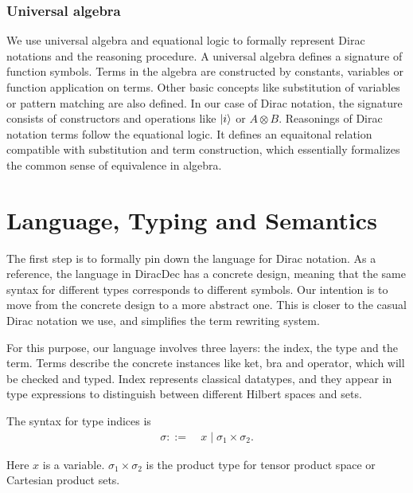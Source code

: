 \documentclass[runningheads]{llncs}
\begin{document}
\subsubsection{Universal algebra}
We use universal algebra and equational logic to formally represent Dirac notations and the reasoning procedure.
A universal algebra defines a signature of function symbols.
Terms in the algebra are constructed by constants, variables or function application on terms. 
Other basic concepts like substitution of variables or pattern matching are also defined.
In our case of Dirac notation, the signature consists of constructors and operations like $\ket{i}$ or $A \otimes B$.
Reasonings of Dirac notation terms follow the equational logic. It defines an equaitonal relation compatible with substitution and term construction, which essentially formalizes the common sense of equivalence in algebra.



\section{Language, Typing and Semantics}
The first step is to formally pin down the language for Dirac notation.
As a reference, the language in DiracDec has a concrete design, meaning that the same syntax for different types corresponds to different symbols.
Our intention is to move from the concrete design to a more abstract one. This is closer to the casual Dirac notation we use, and simplifies the term rewriting system.

For this purpose, our language involves three layers: the index, the type and the term.
Terms describe the concrete instances like ket, bra and operator, which will be checked and typed.
Index represents classical datatypes, and they appear in type expressions to distinguish between different Hilbert spaces and sets.
\begin{definition}
    The syntax for type indices is
    \begin{align*}
        \sigma ::=\ & x \mid \sigma_1 \times \sigma_2.
    \end{align*}
\end{definition}
Here $x$ is a variable. $\sigma_1 \times \sigma_2$ is the product type for tensor product space or Cartesian product sets.
\end{document}
